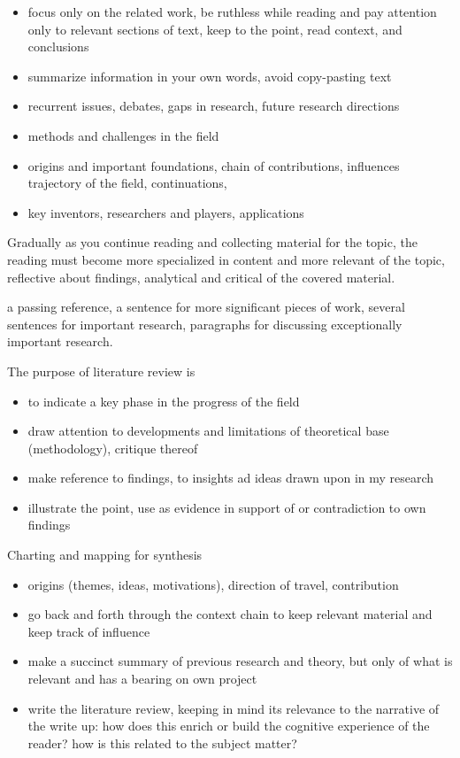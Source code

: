 \documentclass[10pt,a4paper,twocolumn]{article}
\begin{document}
\begin{itemize}
  \item focus only on the related work, be ruthless while reading and pay attention only
  to relevant sections of text, keep to the point, read context, and conclusions
  \item summarize information in your own words, avoid copy-pasting text
\end{itemize}

\begin{itemize}
  \item recurrent issues, debates, gaps in research, future research directions
  \item methods and challenges in the field
  \item origins and important foundations, chain of contributions, influences
  trajectory of the field, continuations,
  \item key inventors, researchers and players, applications
\end{itemize}
Gradually as you continue reading and collecting material for the topic, the reading
must become more specialized in content and more relevant of the topic, reflective about
findings, analytical and critical of the covered material.

a passing reference, a sentence for more significant pieces of work, several sentences
for important research, paragraphs for discussing exceptionally important research.

The purpose of literature review is
\begin{itemize}
  \item to indicate a key phase in the progress of the field
  \item draw attention to developments and limitations of theoretical base (methodology),
  critique thereof
  \item make reference to findings, to insights ad ideas drawn upon in my research
  \item illustrate the point, use as evidence in support of or contradiction to own findings
\end{itemize}

Charting and mapping for synthesis
\begin{itemize}
  \item origins (themes, ideas, motivations), direction of travel, contribution
  \item go back and forth through the context chain to keep relevant material and keep
  track of influence
  \item make a succinct summary of previous research and theory, but only of what is
  relevant and has a bearing on own project
  \item write the literature review, keeping in mind its relevance to the narrative of
  the write up: how does this enrich or build the cognitive experience of the reader? how
  is this related to the subject matter?
\end{itemize}
\end{document}
